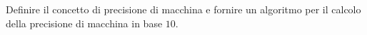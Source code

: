 Definire il concetto di precisione di macchina e fornire un 
algoritmo per il calcolo della precisione di macchina in base 
$10$.
